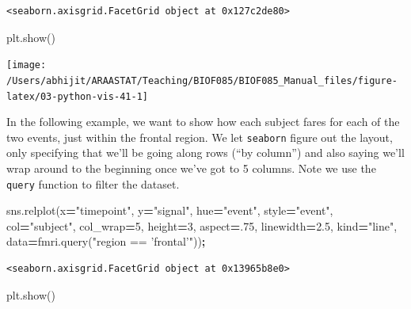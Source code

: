 \documentclass[
  letterpaper,
]{scrbook}
\newenvironment{Shaded}{\begin{snugshade}}{\end{snugshade}}
\newcommand{\DecValTok}[1]{\textcolor[rgb]{0.00,0.00,0.81}{#1}}
\newcommand{\FloatTok}[1]{\textcolor[rgb]{0.00,0.00,0.81}{#1}}
\newcommand{\NormalTok}[1]{#1}
\newcommand{\OperatorTok}[1]{\textcolor[rgb]{0.81,0.36,0.00}{\textbf{#1}}}
\newcommand{\StringTok}[1]{\textcolor[rgb]{0.31,0.60,0.02}{#1}}
\begin{document}
\begin{verbatim}
<seaborn.axisgrid.FacetGrid object at 0x127c2de80>
\end{verbatim}

\begin{Shaded}
\begin{Highlighting}[]
\NormalTok{plt.show()}
\end{Highlighting}
\end{Shaded}

\begin{center}\texttt{[image: /Users/abhijit/ARAASTAT/Teaching/BIOF085/BIOF085\_Manual\_files/figure-latex/03-python-vis-41-1]} \end{center}

In the following example, we want to show how each subject fares for each of the two events, just within the frontal region. We let \texttt{seaborn} figure out the layout, only specifying that we'll be going along rows (``by column'') and also saying we'll wrap around to the beginning once we've got to 5 columns. Note we use the \texttt{query} function to filter the dataset.

\begin{Shaded}
\begin{Highlighting}[]
\NormalTok{sns.relplot(x}\OperatorTok{=}\StringTok{"timepoint"}\NormalTok{, y}\OperatorTok{=}\StringTok{"signal"}\NormalTok{, hue}\OperatorTok{=}\StringTok{"event"}\NormalTok{, style}\OperatorTok{=}\StringTok{"event"}\NormalTok{,}
\NormalTok{            col}\OperatorTok{=}\StringTok{"subject"}\NormalTok{, col_wrap}\OperatorTok{=}\DecValTok{5}\NormalTok{,}
\NormalTok{            height}\OperatorTok{=}\DecValTok{3}\NormalTok{, aspect}\OperatorTok{=}\NormalTok{.}\DecValTok{75}\NormalTok{, linewidth}\OperatorTok{=}\FloatTok{2.5}\NormalTok{,}
\NormalTok{            kind}\OperatorTok{=}\StringTok{"line"}\NormalTok{, data}\OperatorTok{=}\NormalTok{fmri.query(}\StringTok{"region == 'frontal'"}\NormalTok{))}\OperatorTok{;}
\end{Highlighting}
\end{Shaded}

\begin{verbatim}
<seaborn.axisgrid.FacetGrid object at 0x13965b8e0>
\end{verbatim}

\begin{Shaded}
\begin{Highlighting}[]
\NormalTok{plt.show()}
\end{Highlighting}
\end{Shaded}
\end{document}
